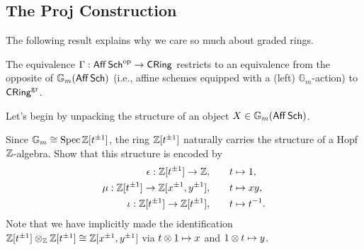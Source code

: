 \documentclass[11pt]{article}
\newcommand{\GG}{\mathbb{G}}
\begin{document}
\subsection{The Proj Construction}
The following result explains why we care so much about graded rings.

\begin{theorem}
The equivalence $\Gamma: \operatorname{\mathsf{Aff}}\operatorname{\mathsf{Sch}}^{\operatorname{op}}\to\operatorname{\mathsf{CRing}}$ restricts to an equivalence from the opposite of $\GG_m(\Aff\Sch)$ (i.e., affine schemes equipped with a (left) $\GG_m$-action) to $\operatorname{\mathsf{CRing}}^{\operatorname{gr}}$.
\end{theorem}

Let's begin by unpacking the structure of an object $X\in\GG_m(\Aff\Sch)$. 

\begin{exercise}
Since $\GG_m\iso\Spec\Z[t^{\pm1}]$, the ring $\mathbb{Z}[t^{\pm1}]$ naturally carries the structure of a Hopf $\mathbb{Z}$-algebra. Show that this structure is encoded by 
\begin{align*}
\epsilon: \mathbb{Z}[t^{\pm1}]\to\mathbb{Z},\qquad & t\mapsto1, \\
\mu: \mathbb{Z}[t^{\pm1}]\to\mathbb{Z}[x^{\pm1},y^{\pm1}],\qquad & t\mapsto xy, \\
\iota: \mathbb{Z}[t^{\pm1}]\to\mathbb{Z}[t^{\pm1}],\qquad & t\mapsto t^{-1}.
\end{align*}
Note that we have implicitly made the identification $\mathbb{Z}[t^{\pm1}]\otimes_{\mathbb{Z}}\mathbb{Z}[t^{\pm1}]\cong\mathbb{Z}[x^{\pm1},y^{\pm1}]$ via $t\otimes1\mapsto x$ and $1\otimes t\mapsto y$.
\end{exercise}
\end{document}
